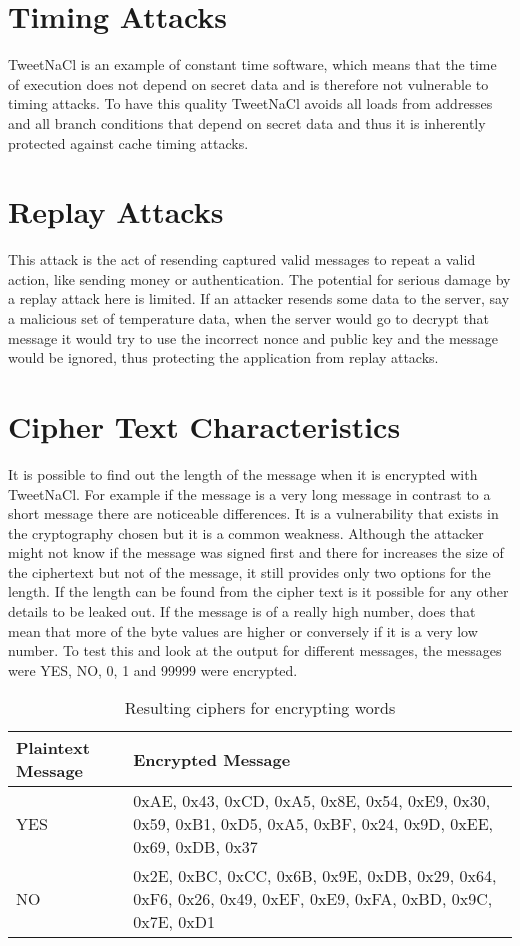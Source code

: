 \section{Timing Attacks}

TweetNaCl is an example of constant time software, which means that the time of execution does not depend on secret data and is therefore not vulnerable to timing attacks. To have this quality TweetNaCl avoids all loads from addresses and all branch conditions that depend on secret data and thus it is inherently protected against cache timing attacks. 

\section{Replay Attacks}

This attack is the act of resending captured valid messages to repeat a valid action, like sending money or authentication. The potential for serious damage by a replay attack here is limited. If an attacker resends some data to the server, say a malicious set of temperature data, when the server would go to decrypt that message it would try to use the incorrect nonce and public key and the message would be ignored, thus protecting the application from replay attacks.

\section{Cipher Text Characteristics}

It is possible to find out the length of the message when it is encrypted with TweetNaCl. For example if the message is a very long message in contrast to a short message there are noticeable differences. It is a vulnerability that exists in the cryptography chosen but it is a common weakness. Although the attacker might not know if the message was signed first and there for increases the size of the ciphertext but not of the message, it still provides only two options for the length. If the length can be found from the cipher text is it possible for any other details to be leaked out. If the message is of a really high number, does that mean that more of the byte values are higher or conversely if it is a very low number. To test this and look at the output for different messages, the messages were YES, NO, 0, 1 and 99999 were encrypted. 

\begin{table}[H]
	\centering
	\begin{tabular}{ | l | p{7cm} | }
	\hline
	Plaintext Message & Encrypted Message \\ \hline
	YES & 0xAE, 0x43, 0xCD, 0xA5, 0x8E, 0x54, 0xE9,  0x30, 0x59, 0xB1, 0xD5, 0xA5, 0xBF, 0x24, 0x9D, 0xEE, 0x69, 0xDB, 0x37  \\ \hline
	NO &  0x2E, 0xBC, 0xCC, 0x6B, 0x9E, 0xDB, 0x29, 0x64, 0xF6, 0x26, 0x49, 0xEF, 0xE9, 0xFA, 0xBD, 0x9C, 0x7E, 0xD1 \\ \hline
	\end{tabular}
	\caption{Resulting ciphers for encrypting words}
	\label{tab:yesno}
\end{table}

